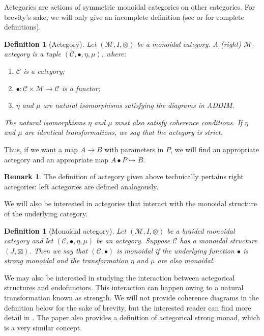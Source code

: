\documentclass[12pt,a4paper,openright,twoside]{report}
\theoremstyle{plain}
\newtheorem{definition}[proposition]{Definition}
\theoremstyle{definition}
\newtheorem{remark}[proposition]{Remark}
\begin{document}
Actegories are actions of symmetric monoidal categories on other categories. For brevity's sake, we will only give an incomplete definition (see \cite{capucci2022actegories} or \cite{gavranovic2024fundamental} for complete definitions).

\begin{definition}[Actegory]
  Let $(\mathcal{M},I,\otimes)$ be a monoidal category. A (right) $\mathcal{M}$-actegory is a tuple $(\mathcal{C}, \bullet, \eta, \mu)$, where:
  \begin{enumerate}
    \item $\mathcal{C}$ is a category;
    \item $\bullet: \mathcal{C} \times \mathcal{M} \to \mathcal{C}$ is a functor;
    \item $\eta$ and $\mu$ are natural isomorphisms satisfying the diagrams in ADDIM.
  \end{enumerate}
  The natural isomorphisms $\eta$ and $\mu$ must also satisfy coherence conditions. If $\eta$ and $\mu$ are identical transformations, we say that the actegory is strict.
\end{definition}

Thus, if we want a map $A \to B$ with parameters in $P$, we will find an appropriate actegory and an appropriate map $A \bullet P \to B$.

\begin{remark}
  The definition of actegory given above technically pertains right actegories: left actegories are defined analogously.
\end{remark}

We will also be interested in actegories that interact with the monoidal structure of the underlying category.

\begin{definition}[Monoidal actegory]
  Let $(\mathcal{M},I,\otimes)$ be a braided monoidal category and let $(\mathcal{C}, \bullet, \eta, \mu)$ be an actegory. Suppose $\mathcal{C}$ has a monoidal structure $(J,\boxtimes)$. Then we say that $(\mathcal{C}, \bullet)$ is monoidal if the underlying function $\bullet$ is strong monoidal and the transformation $\eta$ and $\mu$ are also monoidal.
\end{definition}


We may also be interested in studying the interaction between actegorical structures and endofunctors. This interaction can happen owing to a natural transformation known as strength. We will not provide coherence diagrams in the definition below for the sake of brevity, but the interested reader can find more detail in \cite{gavranovicposition}. The paper also provides a definition of actegorical strong monad, which is a very similar concept.
\end{document}
